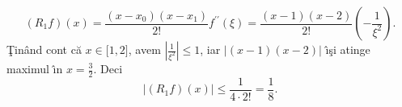 \documentclass{article}%
\begin{document}
%
\[
(R_{1}f)(x)=\frac{(x-x_{0})(x-x_{1})}{2!}f^{\prime\prime}(\xi)=\frac
{(x-1)(x-2)}{2!}\left(  -\frac{1}{\xi^{2}}\right)  .
\]
\c{T}in\^{a}nd cont c\u{a} $x\in\lbrack1,2]$, avem $\left\vert \frac{1}%
{\xi^{2}}\right\vert \leq1$, iar $|(x-1)(x-2)|$ \^{\i}\c{s}i atinge maximul
\^{\i}n $x=\frac{3}{2}$. Deci%
\[
\left\vert (R_{1}f)(x)\right\vert \leq\frac{1}{4\cdot2!}=\frac{1}{8}.
\]
\end{document}
